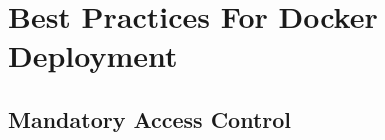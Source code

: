 \documentclass[a4paper,12pt]{article}
\begin{document}




\newpage

\section{Best Practices For Docker Deployment}

\subsection{Mandatory Access Control}
\end{document}

